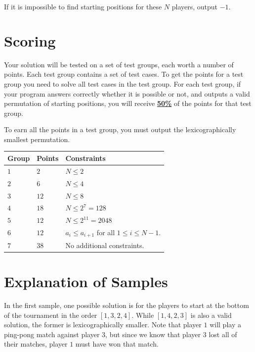 If it is impossible to find starting positions for these $N$ players, output $-1$.

\section*{Scoring}
Your solution will be tested on a set of test groups, each worth a number of points. Each test group contains
a set of test cases. To get the points for a test group you need to solve all test cases in the test group.
For each test group, if your program answers correctly whether it is possible or not,  
and outputs a valid permutation of starting positions, you will receive \underline{\textbf{50\%}} of the points for that test group.

To earn all the points in a test group, you must output the lexicographically smallest permutation.

\noindent
\begin{tabular}{| l | l | p{12cm} |}
  \hline
  \textbf{Group} & \textbf{Points} & \textbf{Constraints} \\ \hline
  $1$    & $2$        & $N \leq 2$ \\ \hline
  $2$    & $6$        & $N \leq 4$ \\ \hline
  $3$    & $12$       & $N \leq 8$ \\ \hline
  $4$    & $18$       & $N \leq 2^7 = 128$ \\ \hline
  $5$    & $12$       & $N \leq 2^{11} = 2048$ \\ \hline
  $6$    & $12$       & $a_i \leq a_{i+1}$ for all $1 \leq i \leq N-1$. \\ \hline 
  $7$    & $38$       & No additional constraints. \\ \hline %
\end{tabular}


\section*{Explanation of Samples}
In the first sample, one possible solution is for the players to start at the bottom of the tournament in the order $[1, 3, 2, 4]$. While $[1, 4, 2, 3]$ is also a valid solution, the former is lexicographically smaller.
Note that player $1$ will play a ping-pong match against player $3$, but since we know that player $3$ lost all of their matches, player $1$ must have won that match.

